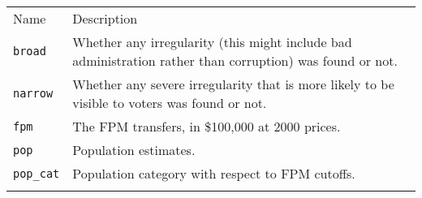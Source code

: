 \documentclass[]{article}
\begin{document}
\begin{longtable}[c]{@{}ll@{}}
\toprule\addlinespace
\begin{minipage}[b]{0.34\columnwidth}\raggedright
Name
\end{minipage} & \begin{minipage}[b]{0.59\columnwidth}\raggedright
Description
\end{minipage}
\\\addlinespace
\midrule\endhead
\begin{minipage}[t]{0.34\columnwidth}\raggedright
\texttt{broad}
\end{minipage} & \begin{minipage}[t]{0.59\columnwidth}\raggedright
Whether any irregularity (this might include bad administration rather
than corruption) was found or not.
\end{minipage}
\\\addlinespace
\begin{minipage}[t]{0.34\columnwidth}\raggedright
\texttt{narrow}
\end{minipage} & \begin{minipage}[t]{0.59\columnwidth}\raggedright
Whether any severe irregularity that is more likely to be visible to
voters was found or not.
\end{minipage}
\\\addlinespace
\begin{minipage}[t]{0.34\columnwidth}\raggedright
\texttt{fpm}
\end{minipage} & \begin{minipage}[t]{0.59\columnwidth}\raggedright
The FPM transfers, in \$100,000 at 2000 prices.
\end{minipage}
\\\addlinespace
\begin{minipage}[t]{0.34\columnwidth}\raggedright
\texttt{pop}
\end{minipage} & \begin{minipage}[t]{0.59\columnwidth}\raggedright
Population estimates.
\end{minipage}
\\\addlinespace
\begin{minipage}[t]{0.34\columnwidth}\raggedright
\texttt{pop\_cat}
\end{minipage} & \begin{minipage}[t]{0.59\columnwidth}\raggedright
Population category with respect to FPM cutoffs.
\end{minipage}
\\\addlinespace
\bottomrule
\end{longtable}
\end{document}
